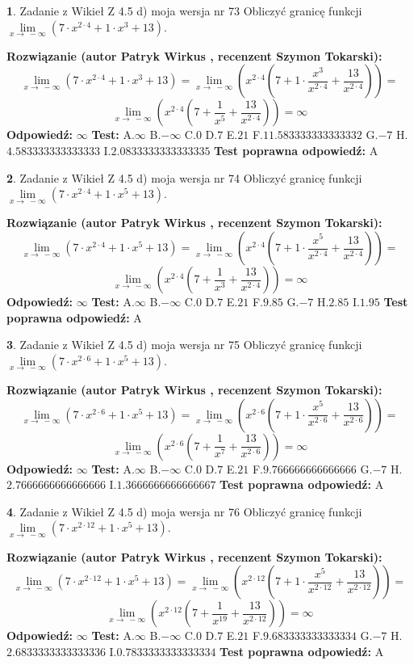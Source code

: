 \documentclass[12pt, a4paper]{article}
\theoremstyle{definition} %
\newtheorem{zad}{}
\newcommand{\zadStart}[1]{\begin{zad}#1\newline}
\newcommand{\zadStop}{\end{zad}}
\newcommand{\rozwStart}[2]{\noindent \textbf{Rozwiązanie (autor #1 , recenzent #2): }\newline}
\newcommand{\rozwStop}{\newline}
\newcommand{\odpStart}{\noindent \textbf{Odpowiedź:}\newline}
\newcommand{\odpStop}{\newline}
\newcommand{\testStart}{\noindent \textbf{Test:}\newline}
\newcommand{\testStop}{\newline}
\newcommand{\kluczStart}{\noindent \textbf{Test poprawna odpowiedź:}\newline}
\newcommand{\kluczStop}{\newline}
\begin{document}
\zadStart{Zadanie z Wikieł Z 4.5 d) moja wersja nr 73}
Obliczyć granicę funkcji  $\lim\limits_{x\to\ -\infty}(7 \cdot x^{2\cdot4}+1 \cdot x^{3}+13)$.
\zadStop
\rozwStart{Patryk Wirkus}{Szymon Tokarski}
$$\lim\limits_{x\to\ -\infty}(7 \cdot x^{2\cdot4}+1 \cdot x^{3}+13) = \lim\limits_{x\to\ -\infty}(x^{2\cdot4}(7 +1 \cdot \frac{x^{3}}{x^{2\cdot4}}+\frac{13}{x^{2\cdot4}})) =$$ $$\lim\limits_{x\to\ -\infty}(x^{2\cdot4}(7 +\frac{1}{x^{5}}+\frac{13}{x^{2\cdot4}})) =\infty$$
\rozwStop
\odpStart
$\infty$
\odpStop
\testStart
A.$\infty$ B.$-\infty$ C.$0$ D.$7$ E.$21$
F.$11.583333333333332$ G.$-7$
H.$4.583333333333333$
I.$2.0833333333333335$
\testStop
\kluczStart
A
\kluczStop



\zadStart{Zadanie z Wikieł Z 4.5 d) moja wersja nr 74}
Obliczyć granicę funkcji  $\lim\limits_{x\to\ -\infty}(7 \cdot x^{2\cdot4}+1 \cdot x^{5}+13)$.
\zadStop
\rozwStart{Patryk Wirkus}{Szymon Tokarski}
$$\lim\limits_{x\to\ -\infty}(7 \cdot x^{2\cdot4}+1 \cdot x^{5}+13) = \lim\limits_{x\to\ -\infty}(x^{2\cdot4}(7 +1 \cdot \frac{x^{5}}{x^{2\cdot4}}+\frac{13}{x^{2\cdot4}})) =$$ $$\lim\limits_{x\to\ -\infty}(x^{2\cdot4}(7 +\frac{1}{x^{3}}+\frac{13}{x^{2\cdot4}})) =\infty$$
\rozwStop
\odpStart
$\infty$
\odpStop
\testStart
A.$\infty$ B.$-\infty$ C.$0$ D.$7$ E.$21$
F.$9.85$ G.$-7$
H.$2.85$
I.$1.95$
\testStop
\kluczStart
A
\kluczStop



\zadStart{Zadanie z Wikieł Z 4.5 d) moja wersja nr 75}
Obliczyć granicę funkcji  $\lim\limits_{x\to\ -\infty}(7 \cdot x^{2\cdot6}+1 \cdot x^{5}+13)$.
\zadStop
\rozwStart{Patryk Wirkus}{Szymon Tokarski}
$$\lim\limits_{x\to\ -\infty}(7 \cdot x^{2\cdot6}+1 \cdot x^{5}+13) = \lim\limits_{x\to\ -\infty}(x^{2\cdot6}(7 +1 \cdot \frac{x^{5}}{x^{2\cdot6}}+\frac{13}{x^{2\cdot6}})) =$$ $$\lim\limits_{x\to\ -\infty}(x^{2\cdot6}(7 +\frac{1}{x^{7}}+\frac{13}{x^{2\cdot6}})) =\infty$$
\rozwStop
\odpStart
$\infty$
\odpStop
\testStart
A.$\infty$ B.$-\infty$ C.$0$ D.$7$ E.$21$
F.$9.766666666666666$ G.$-7$
H.$2.7666666666666666$
I.$1.3666666666666667$
\testStop
\kluczStart
A
\kluczStop



\zadStart{Zadanie z Wikieł Z 4.5 d) moja wersja nr 76}
Obliczyć granicę funkcji  $\lim\limits_{x\to\ -\infty}(7 \cdot x^{2\cdot12}+1 \cdot x^{5}+13)$.
\zadStop
\rozwStart{Patryk Wirkus}{Szymon Tokarski}
$$\lim\limits_{x\to\ -\infty}(7 \cdot x^{2\cdot12}+1 \cdot x^{5}+13) = \lim\limits_{x\to\ -\infty}(x^{2\cdot12}(7 +1 \cdot \frac{x^{5}}{x^{2\cdot12}}+\frac{13}{x^{2\cdot12}})) =$$ $$\lim\limits_{x\to\ -\infty}(x^{2\cdot12}(7 +\frac{1}{x^{19}}+\frac{13}{x^{2\cdot12}})) =\infty$$
\rozwStop
\odpStart
$\infty$
\odpStop
\testStart
A.$\infty$ B.$-\infty$ C.$0$ D.$7$ E.$21$
F.$9.683333333333334$ G.$-7$
H.$2.6833333333333336$
I.$0.7833333333333334$
\testStop
\kluczStart
A
\kluczStop
\end{document}
